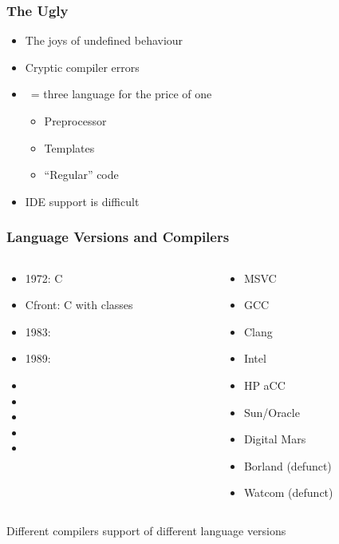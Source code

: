 \begin{frame}
  \frametitle{The Ugly}
  \begin{itemize}
    \item The joys of undefined behaviour
    \item Cryptic compiler errors
    \item \cpp\ = three language for the price of one
          \begin{itemize}
            \item Preprocessor
            \item Templates
            \item ``Regular'' code
          \end{itemize}
    \item IDE support is difficult
  \end{itemize}
\end{frame}


\begin{frame}
  \frametitle{Language Versions and Compilers}
  \begin{columns}
    \begin{column}{5cm}
      \begin{itemize}
        \item 1972: C
        \item Cfront: C with classes
        \item 1983: \cpp
        \item 1989: 
        \item {}
        \item {}
        \item {}
        \item {}
        \item {}
      \end{itemize}
    \end{column}
    \begin{column}{5cm}
      \begin{itemize}
        \item MSVC
        \item GCC
        \item Clang
        \item Intel \cpp
        \item HP aCC
        \item Sun/Oracle \cpp
        \item Digital Mars \cpp
        \item Borland (defunct)
        \item Watcom (defunct)
      \end{itemize}
    \end{column}
  \end{columns}
  \begin{center}
    Different compilers support 
    of different language versions
  \end{center}
\end{frame}

